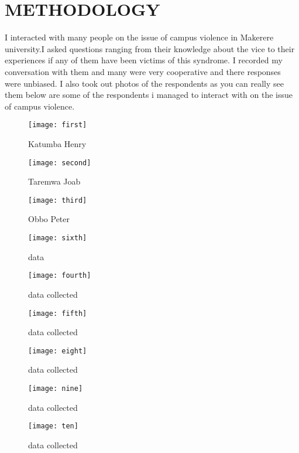\documentclass[10pt]{article}
\begin{document}
\section{METHODOLOGY}
{I interacted with many people on the issue of campus violence in Makerere university.I asked questions ranging from their knowledge about the vice to their experiences if any of them have been victims of this syndrome. I recorded my conversation with them and many were very cooperative and there responses were unbiased. I also took out photos of  the respondents as you can really see them below are some of the respondents i managed to interact with on the issue of campus violence.
	\begin{figure}
	\caption{Katumba Henry}
	\centering
	\texttt{[image: first]}
\end{figure}
	\begin{figure}
	\caption{Taremwa Joab}
	\centering
	\texttt{[image: second]}
\end{figure}
\begin{figure}
	\caption{Obbo Peter}
	\centering
	\texttt{[image: third]}
\end{figure}
\begin{figure}
	\caption{data}
	\centering
	\texttt{[image: sixth]}
\end{figure}
\begin{figure}
	\caption{data collected}
	\centering
	\texttt{[image: fourth]}
\end{figure}
\begin{figure}
	\caption{data collected}
	\centering
	\texttt{[image: fifth]}
\end{figure}
\begin{figure}
	\caption{data collected}
	\centering
	\texttt{[image: eight]}
\end{figure}
\begin{figure}
	\caption{data collected}
	\centering
	\texttt{[image: nine]}
\end{figure}
\begin{figure}
	\caption{data collected}
	\centering
	\texttt{[image: ten]}
\end{figure}

}
\end{document}

